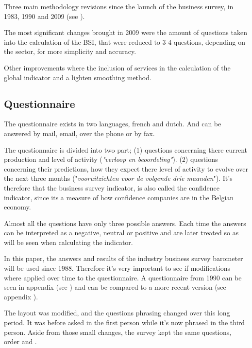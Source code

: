 \documentclass[12pt,a4paper,oneside]{book}
\begin{document}
Three main methodology revisions since the launch of the business survey, in 1983, 1990 and 2009 (see \cite{de_greef_national_2009}).

The most significant changes brought in 2009 were the amount of questions taken into the calculation of the BSI, that were reduced to 3-4 questions, depending on the sector, for more simplicity and accuracy.

Other improvements where the inclusion of services in the calculation of the global indicator and a  lighten smoothing method.


\subsection{Questionnaire}
\label{sec:Questionnaire}

The questionnaire exists in two languages, french and dutch. And can be answered by mail, email, over the phone or by fax.

The questionnaire is divided into two part; 
(1) questions concerning there current production and level of activity (\textit{"verloop en beoordeling"}).
(2) questions concerning their predictions, how they expect there level of activity to evolve over the next three months ("\textit{vooruitzichten voor de volgende drie maanden}").
It's therefore that the business survey indicator, is also called the confidence indicator, since its a measure of how confidence companies are in the Belgian economy.

Almost all the questions have only three possible answers. Each time the answers can be interpreted as a negative, neutral or positive and are later treated so as will be seen when calculating the indicator.


In this paper, the answers and results of the industry business survey barometer will be used since 1988. Therefore it's very important to see if modifications where applied over time to the questionnaire.
A questionnaire from 1990 can be seen in appendix (see ) and can be compared to a more recent version (see appendix ).

The layout was modified, and the questions phrasing changed over this long period. It was before asked in the first person while it's now phrased in the third person. Aside from those small changes, the survey kept the same questions, order and .
\end{document}
